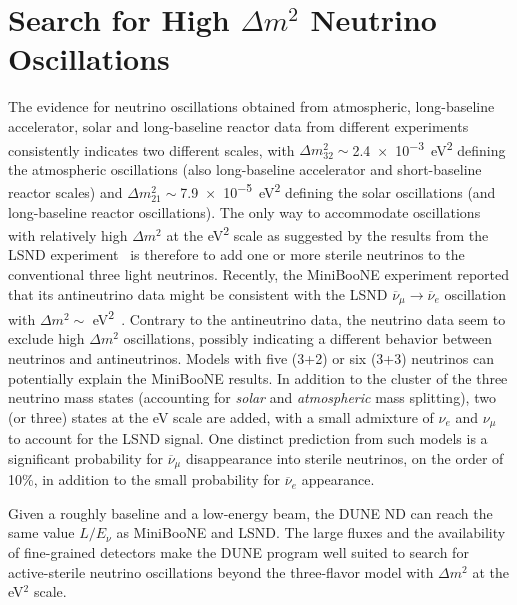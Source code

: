\section{Search for High $\Delta m^2$ Neutrino Oscillations}
\label{sec-high-delmsq}
The evidence for neutrino oscillations obtained from atmospheric,
long-baseline accelerator, solar and long-baseline reactor data from
different experiments consistently indicates two different scales,
with $\Delta m_{32}^2\sim$\SI{2.4e-3}{\eV^2} defining the
atmospheric oscillations (also long-baseline accelerator and
short-baseline reactor scales) and $\Delta m_{21}^2\sim$\SI{7.9e-5}{\eV^2} defining the solar oscillations (and long-baseline
reactor oscillations).  The only way to accommodate oscillations with
relatively high $\Delta m^2$ at the \si{\eV^2} scale as suggested by the
results from the LSND experiment~\cite{Volpe:2001qe} is therefore to
add one or more sterile 
neutrinos to the conventional three light
neutrinos.
Recently, the MiniBooNE experiment reported that its antineutrino
data might be consistent with the LSND $\overline{\nu}_\mu \to \overline{\nu}_e$
oscillation with $\Delta m^2\sim$ \si{\eV^2}~\cite{Maltoni:2007zf}.
Contrary to the antineutrino data, the %
neutrino data seem to
exclude high $\Delta m^2$ oscillations, possibly indicating a 
different behavior between neutrinos and antineutrinos.
Models with five (3+2) or six (3+3) neutrinos can potentially explain
the MiniBooNE results. In addition to the cluster of the three neutrino
mass states (accounting for \emph{solar} and \emph{atmospheric} mass splitting), two
(or three) states at the eV scale are added, with a small
admixture of $\nu_e$ and $\nu_\mu$ to account for the LSND signal. 
One distinct prediction from such models is a significant probability
for $\overline{\nu}_\mu$ disappearance into sterile neutrinos, on the order
of 10\%, in addition to the small probability for $\overline{\nu}_e$ appearance.

  Given a roughly  baseline and a low-energy beam, the DUNE ND
  can reach the same value $L/E_\nu$ as MiniBooNE and LSND. The
  large fluxes and the availability of fine-grained detectors make the
  DUNE program well suited to search for active-sterile neutrino
  oscillations beyond the three-flavor model with $\Delta m^2$ at the
  eV$^2$
  scale. 

